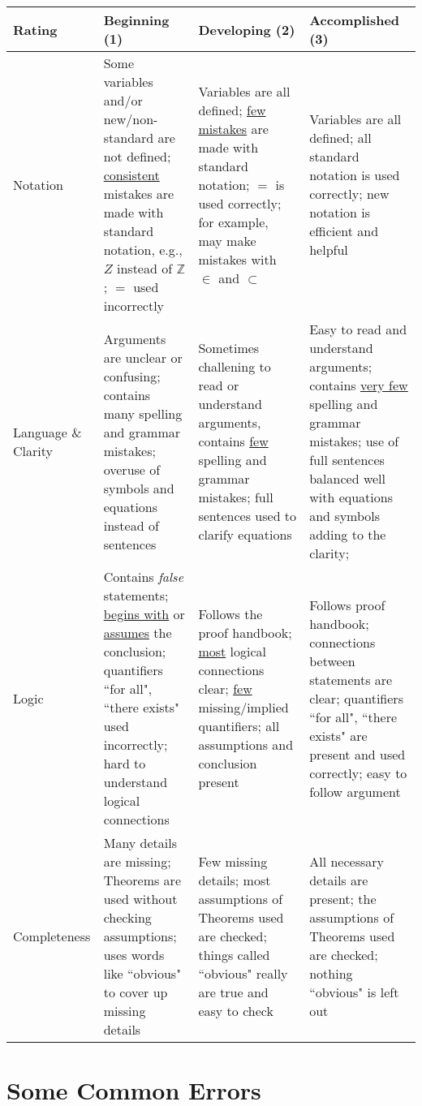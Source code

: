 \documentclass[11pt]{amsart}
\newcommand\Z{\mathbb Z}    %
\begin{document}
\begin{center}
\begin{tabular}{|p{2.3cm}||p{4.5cm} |p{4.5cm} |p{4.5cm} |}
\hline
	\textbf{Rating} & \qquad \qquad \textbf{Beginning (1)}  & \quad \qquad  \textbf{Developing (2)}   &  \qquad \textbf{Accomplished (3)}  \\
\hline
\hline
Notation & Some variables and/or new/non-standard are not defined; \underline{consistent} mistakes are made with standard notation, e.g., $Z$ instead of $\Z$; $=$ used incorrectly & Variables are all defined; \underline{few mistakes} are made with standard notation; $=$ is used correctly; for example, may make mistakes with $\in$ and $\subset$ & Variables are all defined; all standard notation is used correctly; new notation is efficient and helpful\\
\hline
Language \& Clarity & Arguments are unclear or confusing; contains many spelling and grammar mistakes; overuse of symbols and equations instead of sentences  &  Sometimes challening to read or understand arguments, contains \underline{few} spelling and grammar mistakes; full sentences used to clarify equations & Easy to read and understand arguments; contains \underline{very few} spelling and grammar mistakes; use of full sentences balanced well with equations and symbols adding to the clarity; \\
\hline
Logic & Contains \textit{false} statements; \underline{begins with} or \underline{assumes} the conclusion; quantifiers ``for all", ``there exists" used incorrectly; hard to understand logical connections & Follows the proof handbook; \underline{most} logical connections clear; \underline{few} missing/implied quantifiers; all assumptions and conclusion present & Follows proof handbook; connections between statements are clear; quantifiers ``for all", ``there exists" are present and used correctly; easy to follow argument  \\
\hline
Completeness & Many details are missing; Theorems are used without checking assumptions; uses words like ``obvious" to cover up missing details & Few missing details; most assumptions of Theorems used are checked; things called ``obvious" really are true and easy to check & All necessary details are present; the assumptions of Theorems used are checked; nothing ``obvious" is left out \\
\hline
\end{tabular}
\end{center}

\section*{Some Common Errors}
\end{document}
